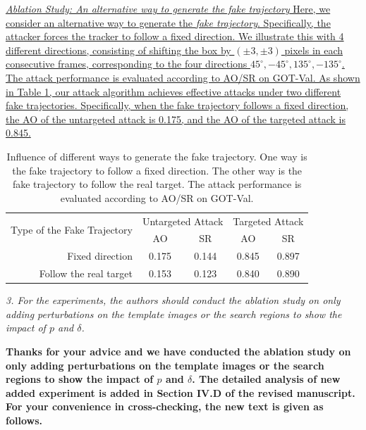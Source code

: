 \documentclass[12pt]{article}
\begin{document}
\uline{
\textit{Ablation Study: An alternative way to generate the fake trajectory}  Here, we consider an alternative way to generate the \textit{fake trajectory}. Specifically, the attacker forces the tracker to follow a fixed direction. We illustrate this with 4 different directions, consisting of shifting the box by $(\pm 3, \pm 3)$ pixels in each consecutive frames, corresponding to the four directions $45^{\circ}, -45^{\circ}, 135^{\circ}, -135^{\circ}$.
The attack performance is evaluated according to AO/SR on GOT-Val.
As shown in Table \ref{table:direction}, our attack algorithm achieves effective attacks under two different fake trajectories. Specifically, when the fake trajectory follows a fixed direction, the AO of the untargeted attack is 0.175, and the AO of the targeted attack is 0.845.
}

\begin{table}[t]
  \renewcommand\thetable{X}
  \centering
  \caption{Influence of different ways to generate the fake trajectory. One way is the fake trajectory to follow a fixed direction. The other way is the fake trajectory to follow the real target. The attack performance is evaluated according to AO/SR on GOT-Val.}
  \begin{tabular}{@{}rcccc@{}}
  \toprule
  \multirow{2}{*}[-2pt]{Type of the Fake Trajectory} & \multicolumn{2}{c}{Untargeted Attack} & \multicolumn{2}{c}{Targeted Attack} \\ \cmidrule{2-5}
                              & AO                & SR                & AO               & SR               \\ \midrule
  Fixed direction             & 0.175             & 0.144             & 0.845            & 0.897            \\
  Follow the real target      & 0.153             & 0.123             & 0.840            & 0.890            \\ \bottomrule        
  \end{tabular}
  \label{table:direction}
\end{table}

\textit{3. For the experiments, the authors should conduct the ablation study on only adding perturbations on the template images or the search regions to show the impact of $p$ and $\delta$.}

\textbf{Thanks for your advice and we have conducted the ablation study on only adding perturbations on the template images or the search regions to show the impact of $p$ and $\delta$.
The detailed analysis of new added experiment is added in Section IV.D of the revised manuscript. For your convenience in cross-checking, the new text is given as follows.}
\end{document}
